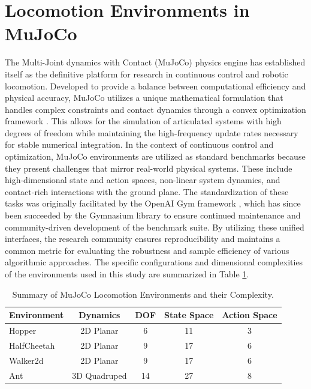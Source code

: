 % 

\section{Locomotion Environments in MuJoCo}
The Multi-Joint dynamics with Contact (MuJoCo) physics engine has established itself as the definitive platform for research in continuous control and robotic locomotion. Developed to provide a balance between computational efficiency and physical accuracy, MuJoCo utilizes a unique mathematical formulation that handles complex constraints and contact dynamics through a convex optimization framework \citep{todorov2012mujoco}. This allows for the simulation of articulated systems with high degrees of freedom while maintaining the high-frequency update rates necessary for stable numerical integration.
In the context of continuous control and optimization, MuJoCo environments are utilized as standard benchmarks because they present challenges that mirror real-world physical systems. These include high-dimensional state and action spaces, non-linear system dynamics, and contact-rich interactions with the ground plane. The standardization of these tasks was originally facilitated by the OpenAI Gym framework \citep{brockman2016gym}, which has since been succeeded by the Gymnasium library \citep{towers2024gymnasium} to ensure continued maintenance and community-driven development of the benchmark suite. By utilizing these unified interfaces, the research community ensures reproducibility and maintains a common metric for evaluating the robustness and sample efficiency of various algorithmic approaches. The specific configurations and dimensional complexities of the environments used in this study are summarized in Table \ref{tab:mujoco_summary}.

\begin{table}[htbp]
    \centering
    \caption{Summary of MuJoCo Locomotion Environments and their Complexity.}
    \label{tab:mujoco_summary}
    \begin{tabular}{@{}lcccc@{}}
        \toprule
        \textbf{Environment} & \textbf{Dynamics} & \textbf{DOF} & \textbf{State Space} & \textbf{Action Space} \\ \midrule
        Hopper               & 2D Planar         & 6            & 11                   & 3                     \\
        HalfCheetah          & 2D Planar         & 9            & 17                   & 6                     \\
        Walker2d             & 2D Planar         & 9            & 17                   & 6                     \\
        Ant                  & 3D Quadruped      & 14           & 27                   & 8                     \\ \bottomrule
    \end{tabular}
\end{table}

